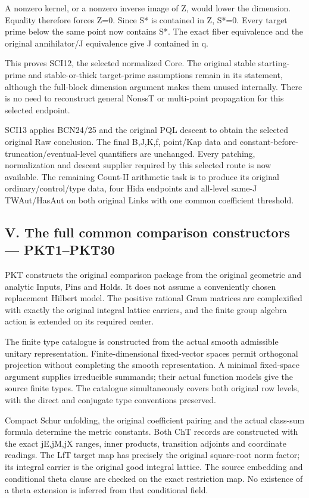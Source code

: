 A nonzero kernel, or a nonzero inverse image of Z, would lower the dimension. Equality therefore forces Z=0. Since S* is contained in Z, S*=0. Every target prime below the same point now contains S*. The exact fiber equivalence and the original annihilator/\allowbreak{}J equivalence give J contained in q.

This proves SCI12, the selected normalized Core. The original stable starting-prime and stable-or-thick target-prime assumptions remain in its statement, although the full-block dimension argument makes them unused internally. There is no need to reconstruct general NonssT or multi-point propagation for this selected endpoint.

SCI13 applies BCN24/\allowbreak{}25 and the original PQL descent to obtain the selected original Raw conclusion. The final B,J,K,f, point/\allowbreak{}Kap data and constant-before-truncation/\allowbreak{}eventual-level quantifiers are unchanged. Every patching, normalization and descent supplier required by this selected route is now available. The remaining Count-II arithmetic task is to produce its original ordinary/\allowbreak{}control/\allowbreak{}type data, four Hida endpoints and all-level same-J TWAut/\allowbreak{}HasAut on both original Links with one common coefficient threshold.

\subsection{V. The full common comparison constructors — PKT1–PKT30}

PKT constructs the original comparison package from the original geometric and analytic Inputs, Pins and Holds. It does not assume a conveniently chosen replacement Hilbert model. The positive rational Gram matrices are complexified with exactly the original integral lattice carriers, and the finite group algebra action is extended on its required center.

The finite type catalogue is constructed from the actual smooth admissible unitary representation. Finite-dimensional fixed-vector spaces permit orthogonal projection without completing the smooth representation. A minimal fixed-space argument supplies irreducible summands; their actual function models give the source finite types. The catalogue simultaneously covers both original row levels, with the direct and conjugate type conventions preserved.

Compact Schur unfolding, the original coefficient pairing and the actual class-sum formula determine the metric constants. Both ChT records are constructed with the exact jE,jM,jX ranges, inner products, transition adjoints and coordinate readings. The LfT target map has precisely the original square-root norm factor; its integral carrier is the original good integral lattice. The source embedding and conditional theta clause are checked on the exact restriction map. No existence of a theta extension is inferred from that conditional field.

